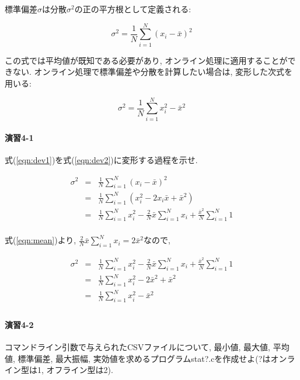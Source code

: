 \documentclass[titlepage]{jsarticle}
\begin{document}
        標準偏差$\sigma$は分散$\sigma^2$の正の平方根として定義される:
        
        \begin{equation} \label{eqn:dev1}
            \sigma^2 = \frac{1}{N} \sum_{i=1}^{N} (x_i - \bar{x})^2
        \end{equation}

        この式では平均値が既知である必要があり, オンライン処理に適用することができない.
        オンライン処理で標準偏差や分散を計算したい場合は, 変形した次式を用いる:

        \begin{equation} \label{eqn:dev2}
            \sigma^2 = \frac{1}{N} \sum_{i=1}^{N} x_i^2 - \bar{x}^2
        \end{equation}

    \paragraph{演習4-1} 式(\ref{eqn:dev1})を式(\ref{eqn:dev2})に変形する過程を示せ.
        
        \begin{eqnarray*}
            \sigma^2 &=& \frac{1}{N} \sum_{i=1}^{N} (x_i - \bar{x})^2 \\
            &=& \frac{1}{N} \sum_{i=1}^{N} (x_i^2 - 2x_i \bar{x} + \bar{x}^2) \\
            &=& \frac{1}{N} \sum_{i=1}^{N} x_i^2 - \frac{2}{N} \bar{x} \sum_{i=1}^{N} x_i + \frac{\bar{x}^2}{N} \sum_{i=1}^{N} 1 \\
        \end{eqnarray*}

        式(\ref{eqn:mean})より, $\displaystyle\frac{2}{N} \bar{x} \sum_{i=1}^{N} x_i = 2 \bar{x}^2$なので,

        \begin{eqnarray*}
            \sigma^2 &=& \frac{1}{N} \sum_{i=1}^{N} x_i^2 - \frac{2}{N} \bar{x} \sum_{i=1}^{N} x_i + \frac{\bar{x}^2}{N} \sum_{i=1}^{N} 1 \\
            &=& \frac{1}{N} \sum_{i=1}^{N} x_i^2 - 2 \bar{x}^2 + \bar{x}^2 \\
            &=& \frac{1}{N} \sum_{i=1}^{N} x_i^2 - \bar{x}^2 \\
        \end{eqnarray*}

    \paragraph{演習4-2} コマンドライン引数で与えられたCSVファイルについて, 最小値, 最大値, 平均値,
    標準偏差, 最大振幅, 実効値を求めるプログラムstat?.cを作成せよ(?はオンライン型は1,
    オフライン型は2).
\end{document}
